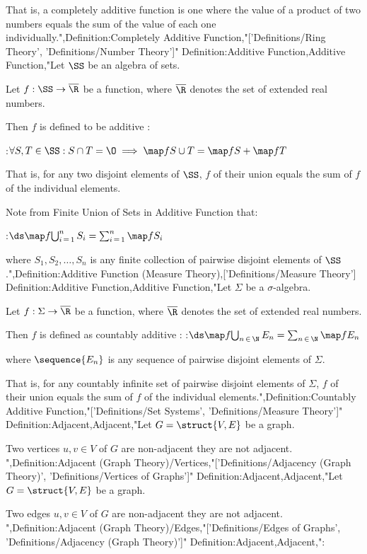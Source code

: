 That is, a completely additive function is one where the value of a product of two numbers equals the sum of the value of each one individually.",Definition:Completely Additive Function,"['Definitions/Ring Theory', 'Definitions/Number Theory']"
Definition:Additive Function,Additive Function,"Let $\SS$ be an algebra of sets.

Let $f: \SS \to \overline \R$ be a function, where $\overline \R$ denotes the set of extended real numbers.


Then $f$ is defined to be additive :

:$\forall S, T \in \SS: S \cap T = \O \implies \map f {S \cup T} = \map f S + \map f T$

That is, for any two disjoint elements of $\SS$, $f$ of their union equals the sum of $f$ of the individual elements.


Note from Finite Union of Sets in Additive Function that:

:$\ds \map f {\bigcup_{i \mathop = 1}^n S_i} = \sum_{i \mathop = 1}^n \map f {S_i}$

where $S_1, S_2, \ldots, S_n$ is any finite collection of pairwise disjoint elements of $\SS$.",Definition:Additive Function (Measure Theory),['Definitions/Measure Theory']
Definition:Additive Function,Additive Function,"Let $\Sigma$ be a $\sigma$-algebra.

Let $f: \Sigma \to \overline \R$ be a function, where $\overline \R$ denotes the set of extended real numbers.


Then $f$ is defined as countably additive :
:$\ds \map f {\bigcup_{n \mathop \in \N} E_n} = \sum_{n \mathop \in \N} \map f {E_n}$

where $\sequence {E_n}$ is any sequence of pairwise disjoint elements of $\Sigma$.


That is, for any countably infinite set of pairwise disjoint elements of $\Sigma$, $f$ of their union equals the sum of $f$ of the individual elements.",Definition:Countably Additive Function,"['Definitions/Set Systems', 'Definitions/Measure Theory']"
Definition:Adjacent,Adjacent,"Let $G = \struct {V, E}$ be a graph.

Two vertices $u, v \in V$ of $G$ are non-adjacent  they are not adjacent.
",Definition:Adjacent (Graph Theory)/Vertices,"['Definitions/Adjacency (Graph Theory)', 'Definitions/Vertices of Graphs']"
Definition:Adjacent,Adjacent,"Let $G = \struct {V, E}$ be a graph.

Two edges $u, v \in V$ of $G$ are non-adjacent  they are not adjacent.
",Definition:Adjacent (Graph Theory)/Edges,"['Definitions/Edges of Graphs', 'Definitions/Adjacency (Graph Theory)']"
Definition:Adjacent,Adjacent,":

